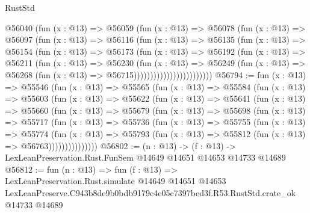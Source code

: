 \begin{lexlean}{RustStd}
\begin{coremodule}
                        @56040
                          (fun (x : @13) =>
                          @56059
                            (fun (x : @13) =>
                            @56078
                              (fun (x : @13) =>
                              @56097
                                (fun (x : @13) =>
                                @56116
                                  (fun (x : @13) =>
                                  @56135
                                    (fun (x : @13) =>
                                    @56154
                                      (fun (x : @13) =>
                                      @56173
                                        (fun (x : @13) =>
                                        @56192
                                          (fun (x : @13) =>
                                          @56211
                                            (fun (x : @13) =>
                                            @56230
                                              (fun (x : @13) =>
                                              @56249
                                                (fun (x : @13) =>
                                                @56268
                                                  (fun (x : @13) => @56715))))))))))))))))))))))))
@56794 := fun (x : @13) =>
  @55546
    (fun (x : @13) =>
    @55565
      (fun (x : @13) =>
      @55584
        (fun (x : @13) =>
        @55603
          (fun (x : @13) =>
          @55622
            (fun (x : @13) =>
            @55641
              (fun (x : @13) =>
              @55660
                (fun (x : @13) =>
                @55679
                  (fun (x : @13) =>
                  @55698
                    (fun (x : @13) =>
                    @55717
                      (fun (x : @13) =>
                      @55736
                        (fun (x : @13) =>
                        @55755
                          (fun (x : @13) =>
                          @55774
                            (fun (x : @13) =>
                            @55793 (fun (x : @13) => @55812 (fun (x : @13) => @56763)))))))))))))))
@56802 := (n : @13) ->
  (f : @13) -> LexLeanPreservation.Rust.FunSem @14649 @14651 @14653 @14733 @14689
@56812 := fun (n : @13) =>
  fun (f : @13) =>
  LexLeanPreservation.Rust.simulate
    @14649
    @14651
    @14653
    LexLeanPreserve.C943b8de9b0bdb9179c4e05c7397bed3f.R53.RustStd.crate_ok
    @14733
    @14689
\end{coremodule}
\end{lexlean}
